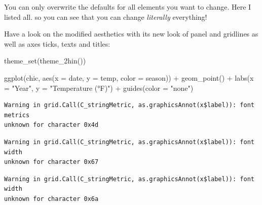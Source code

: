 \documentclass[
  letterpaper,
]{scrbook}
\newenvironment{Shaded}{\begin{snugshade}}{\end{snugshade}}
\newcommand{\AttributeTok}[1]{\textcolor[rgb]{0.40,0.45,0.13}{#1}}
\newcommand{\FunctionTok}[1]{\textcolor[rgb]{0.28,0.35,0.67}{#1}}
\newcommand{\NormalTok}[1]{\textcolor[rgb]{0.00,0.23,0.31}{#1}}
\newcommand{\SpecialCharTok}[1]{\textcolor[rgb]{0.37,0.37,0.37}{#1}}
\newcommand{\StringTok}[1]{\textcolor[rgb]{0.13,0.47,0.30}{#1}}
\begin{document}
\begin{tcolorbox}[enhanced jigsaw, rightrule=.15mm, arc=.35mm, title=\textcolor{quarto-callout-note-color}{\faInfo}\hspace{0.5em}{Note}, colback=white, toptitle=1mm, colbacktitle=quarto-callout-note-color!10!white, breakable, left=2mm, opacityback=0, leftrule=.75mm, bottomrule=.15mm, bottomtitle=1mm, colframe=quarto-callout-note-color-frame, coltitle=black, toprule=.15mm, opacitybacktitle=0.6, titlerule=0mm]

You can only overwrite the defaults for all elements you want to change.
Here I listed all. so you can see that you can change \emph{literally}
everything!

\end{tcolorbox}

Have a look on the modified aesthetics with its new look of panel and
gridlines as well as axes ticks, texts and titles:

\begin{Shaded}
\begin{Highlighting}[]
\FunctionTok{theme\_set}\NormalTok{(}\FunctionTok{theme\_2hin}\NormalTok{())}

\FunctionTok{ggplot}\NormalTok{(chic, }\FunctionTok{aes}\NormalTok{(}\AttributeTok{x =}\NormalTok{ date, }\AttributeTok{y =}\NormalTok{ temp, }\AttributeTok{color =}\NormalTok{ season)) }\SpecialCharTok{+}
  \FunctionTok{geom\_point}\NormalTok{() }\SpecialCharTok{+} \FunctionTok{labs}\NormalTok{(}\AttributeTok{x =} \StringTok{"Year"}\NormalTok{, }\AttributeTok{y =} \StringTok{"Temperature (°F)"}\NormalTok{) }\SpecialCharTok{+} \FunctionTok{guides}\NormalTok{(}\AttributeTok{color =} \StringTok{"none"}\NormalTok{)}
\end{Highlighting}
\end{Shaded}

\begin{verbatim}
Warning in grid.Call(C_stringMetric, as.graphicsAnnot(x$label)): font metrics
unknown for character 0x4d
\end{verbatim}

\begin{verbatim}
Warning in grid.Call(C_stringMetric, as.graphicsAnnot(x$label)): font width
unknown for character 0x67
\end{verbatim}

\begin{verbatim}
Warning in grid.Call(C_stringMetric, as.graphicsAnnot(x$label)): font width
unknown for character 0x6a
\end{verbatim}
\end{document}
